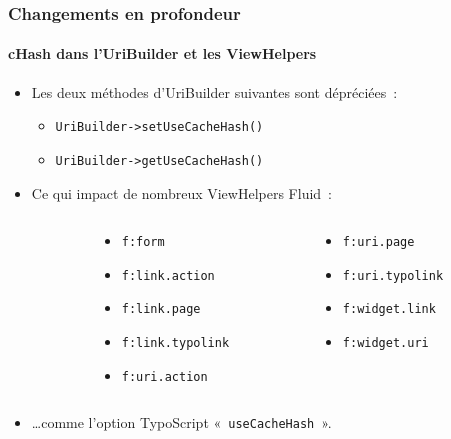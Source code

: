 \begin{frame}[fragile]
	\frametitle{Changements en profondeur}
	\framesubtitle{cHash dans l'UriBuilder et les ViewHelpers}

	\lstset{basicstyle=\smaller\ttfamily}

	\begin{itemize}
		\item Les deux méthodes d'UriBuilder suivantes sont dépréciées~:

			\begin{itemize}
				\item \texttt{UriBuilder->setUseCacheHash()}
				\item \texttt{UriBuilder->getUseCacheHash()}
			\end{itemize}

		\item Ce qui impact de nombreux ViewHelpers Fluid~:
	\end{itemize}
	\begin{columns}[T]
		\begin{column}{.05\textwidth}
		\end{column}
		\begin{column}{.45\textwidth}
			\begin{itemize}\smaller
				\item \texttt{f:form}
				\item \texttt{f:link.action}
				\item \texttt{f:link.page}
				\item \texttt{f:link.typolink}
				\item \texttt{f:uri.action}
			\end{itemize}\normalsize
		\end{column}
		\begin{column}{.45\textwidth}
			\begin{itemize}\smaller
				\item \texttt{f:uri.page}
				\item \texttt{f:uri.typolink}
				\item \texttt{f:widget.link}
				\item \texttt{f:widget.uri}
			\end{itemize}\normalsize
		\end{column}
	\end{columns}
	\vspace{0.2cm}
	\begin{itemize}
		\item \ldots comme l'option TypoScript «~\texttt{useCacheHash}~».
	\end{itemize}

\end{frame}

